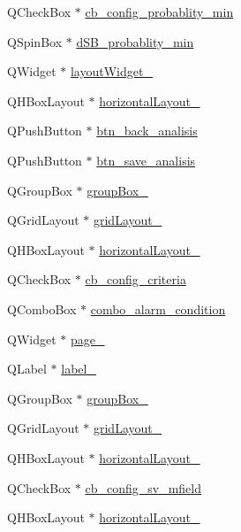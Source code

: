 \begin{DoxyCompactItemize}
\item 
Q\+Check\+Box $\ast$ \hyperlink{a00027_a6e32cc42adcf308df94cbbc9ac226f50}{cb\+\_\+config\+\_\+probablity\+\_\+min}
\item 
Q\+Spin\+Box $\ast$ \hyperlink{a00027_adfd6cf470c736f358c6982f9a635f04f}{d\+S\+B\+\_\+probablity\+\_\+min}
\item 
Q\+Widget $\ast$ \hyperlink{a00027_ac4725768128006ab5bea6e58b67959d0}{layout\+Widget\+\_}
\item 
Q\+H\+Box\+Layout $\ast$ \hyperlink{a00027_afb4ab27a4cd626c64c34ab3651fa8413}{horizontal\+Layout\+\_}
\item 
Q\+Push\+Button $\ast$ \hyperlink{a00027_a5704296b847187d5975858d04c8c2513}{btn\+\_\+back\+\_\+analisis}
\item 
Q\+Push\+Button $\ast$ \hyperlink{a00027_a231adeaeca96ac21170495bfb1422e5e}{btn\+\_\+save\+\_\+analisis}
\item 
Q\+Group\+Box $\ast$ \hyperlink{a00027_af55cd87dbe0f7d42980b1012f15cae2d}{group\+Box\+\_}
\item 
Q\+Grid\+Layout $\ast$ \hyperlink{a00027_aa03590dd5aac614bf717649a544c015f}{grid\+Layout\+\_}
\item 
Q\+H\+Box\+Layout $\ast$ \hyperlink{a00027_a1351e317cba7ca711b6b4d2212b6bf36}{horizontal\+Layout\+\_}
\item 
Q\+Check\+Box $\ast$ \hyperlink{a00027_a89574c631636929702a5928b2a159892}{cb\+\_\+config\+\_\+criteria}
\item 
Q\+Combo\+Box $\ast$ \hyperlink{a00027_a2af463e4a88fddd219f2e41a386fbd68}{combo\+\_\+alarm\+\_\+condition}
\item 
Q\+Widget $\ast$ \hyperlink{a00027_a48c3dca01f963265cd2ffca998842e05}{page\+\_}
\item 
Q\+Label $\ast$ \hyperlink{a00027_af183bfbfb9f38bbdd60caf92b15e23dc}{label\+\_}
\item 
Q\+Group\+Box $\ast$ \hyperlink{a00027_a417cb0342ea95d3fe5f7e3f4feeb6515}{group\+Box\+\_}
\item 
Q\+Grid\+Layout $\ast$ \hyperlink{a00027_adbbd44debcfc24db144006951bf7b3e1}{grid\+Layout\+\_}
\item 
Q\+H\+Box\+Layout $\ast$ \hyperlink{a00027_a49a16c34d46bb0d66edb10c3b92b226c}{horizontal\+Layout\+\_}
\item 
Q\+Check\+Box $\ast$ \hyperlink{a00027_a0a83284035ab2dbaeb39946522434986}{cb\+\_\+config\+\_\+sv\+\_\+mfield}
\item 
Q\+H\+Box\+Layout $\ast$ \hyperlink{a00027_a8cfe172f7719cf363fc630c536cad6c3}{horizontal\+Layout\+\_}

\end{DoxyCompactItemize}
